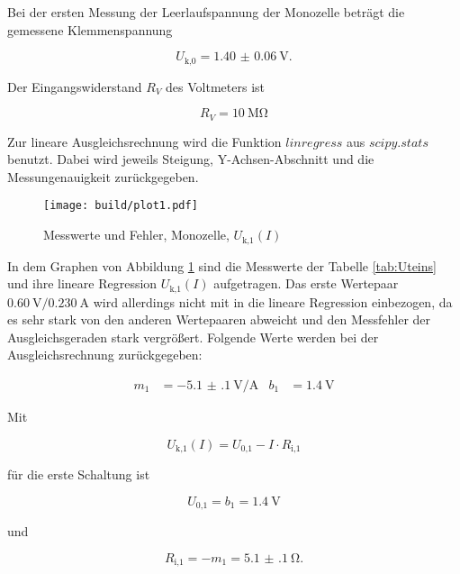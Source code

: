   Bei der ersten Messung der Leerlaufspannung der Monozelle beträgt die
  gemessene Klemmenspannung

  \begin{equation}
    U_\text{k,0} = \SI{1.40(6)}{\V}.
  \end{equation}

  Der Eingangswiderstand $R_V$ des Voltmeters ist

  \begin{equation}
    R_V = \SI{10}{\mega\ohm}
  \end{equation}

  Zur lineare Ausgleichsrechnung wird die Funktion $linregress$ aus $scipy.stats$
  \cite{scipy}
  benutzt. Dabei wird jeweils Steigung, Y-Achsen-Abschnitt und die
  Messungenauigkeit zurückgegeben.

  \begin{figure}[h]
    \centering
    \texttt{[image: build/plot1.pdf]}
    \caption{Messwerte und Fehler, Monozelle,  $U_\text{k,1}(I)$}
    \label{fig:Ueins}
  \end{figure}

  In dem Graphen von Abbildung \ref{fig:Ueins} sind die Messwerte der Tabelle
  \ref{tab:Uteins} und ihre lineare Regression
  $U_\text{k,1}(I)$ aufgetragen.
  Das erste Wertepaar $\SI{0.60}{\V}/ \SI{0.230}{\A}$
  wird allerdings nicht mit in die lineare Regression einbezogen,
  da es sehr stark von den anderen Wertepaaren abweicht und
  den Messfehler der Ausgleichsgeraden stark vergrößert.
  Folgende Werte werden bei der Ausgleichsrechnung zurückgegeben:

  \begin{align}
    m_1 & = \SI{-5.1(1)}{\V\per\A} & b_1 & = \SI{1.4}{\V}
  \end{align}

  Mit

  \begin{equation}
    U_\text{k,1}(I) = U_\text{0,1} - I \cdot R_\text{i,1}
  \end{equation}

  für die erste Schaltung ist

  \begin{equation}
    U_\text{0,1} = b_1 = \SI{1.4}{\V}
  \end{equation}

  und

  \begin{equation}
    R_\text{i,1} = -m_1 = \SI{5.1(1)}{\ohm}.
  \end{equation}

